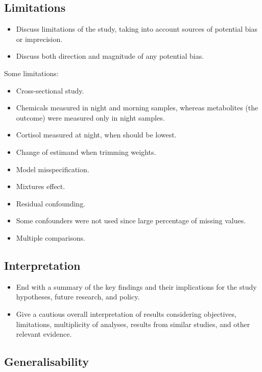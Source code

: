 \documentclass[
  letterpaper,
  DIV=11,
  numbers=noendperiod]{scrartcl}
\providecommand{\tightlist}{%
  \setlength{\itemsep}{0pt}\setlength{\parskip}{0pt}}\usepackage{longtable,booktabs,array}
\begin{document}
\subsection{Limitations}\label{sec-limitations}

\begin{itemize}
\tightlist
\item
  Discuss limitations of the study, taking into account sources of
  potential bias or imprecision.
\item
  Discuss both direction and magnitude of any potential bias.
\end{itemize}

Some limitations:

\begin{itemize}
\tightlist
\item
  Cross-sectional study.
\item
  Chemicals measured in night and morning samples, whereas metabolites
  (the outcome) were measured only in night samples.
\item
  Cortisol measured at night, when should be lowest.
\item
  Change of estimand when trimming weights.
\item
  Model misspecification.
\item
  Mixtures effect.
\item
  Residual confounding.
\item
  Some confounders were not used since large percentage of missing
  values.
\item
  Multiple comparisons.
\end{itemize}

\subsection{Interpretation}\label{sec-interpretation}

\begin{itemize}
\tightlist
\item
  End with a summary of the key findings and their implications for the
  study hypotheses, future research, and policy.
\item
  Give a cautious overall interpretation of results considering
  objectives, limitations, multiplicity of analyses, results from
  similar studies, and other relevant evidence.
\end{itemize}

\subsection{Generalisability}\label{sec-general}
\end{document}
